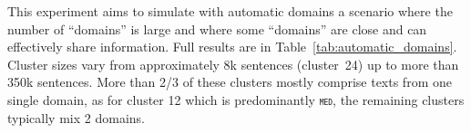 \documentclass[11pt]{article}
\newcommand{\domain}[1]{\texttt{\textsc{#1}}}
\begin{document}
This experiment aims to simulate with automatic domains a scenario where the number of ``domains'' is large and where some ``domains'' are close and can effectively share information. Full results are in Table~\ref{tab:automatic_domains}. Cluster sizes vary from approximately 8k sentences (cluster~24) up to more than 350k sentences. More than 2/3 of these clusters mostly comprise texts from one single domain, as for cluster 12 which is predominantly \domain{med}, the remaining clusters typically mix 2 domains.
\end{document}
